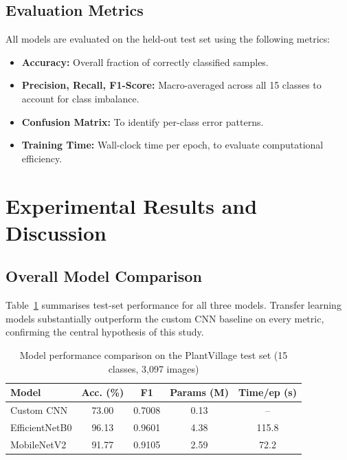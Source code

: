 \documentclass[10pt,twocolumn]{article}
\begin{document}
\subsection{Evaluation Metrics}

All models are evaluated on the held-out test set using the following metrics:
\begin{itemize}
  \item \textbf{Accuracy:} Overall fraction of correctly classified samples.
  \item \textbf{Precision, Recall, F1-Score:} Macro-averaged across all 15 classes to account for class imbalance.
  \item \textbf{Confusion Matrix:} To identify per-class error patterns.
  \item \textbf{Training Time:} Wall-clock time per epoch, to evaluate computational efficiency.
\end{itemize}

\section{Experimental Results and Discussion}

\subsection{Overall Model Comparison}

Table~\ref{tab:results} summarises test-set performance for all three models. Transfer learning models substantially outperform the custom CNN baseline on every metric, confirming the central hypothesis of this study.

\begin{table}[H]
\centering
\caption{Model performance comparison on the PlantVillage test set (15 classes, 3,097 images)}
\label{tab:results}
\begin{tabular}{lcccc}
\toprule
\textbf{Model} & \textbf{Acc. (\%)} & \textbf{F1} & \textbf{Params (M)} & \textbf{Time/ep (s)} \\
\midrule
Custom CNN     & 73.00 & 0.7008 & 0.13 & -- \\
EfficientNetB0 & 96.13 & 0.9601 & 4.38 & 115.8 \\
MobileNetV2    & 91.77 & 0.9105 & 2.59 & 72.2 \\
\bottomrule
\end{tabular}
\end{table}
\end{document}

